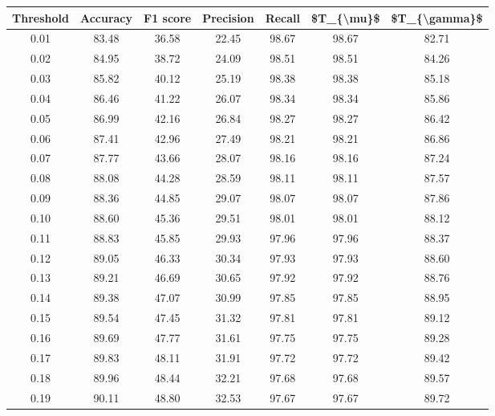 \begin{tabular}{|c|c|c|c|c|c|c|}
\hline
 Threshold &  Accuracy &  F1 score &  Precision &  Recall &  \$T\_\{\textbackslash mu\}\$ &  \$T\_\{\textbackslash gamma\}\$ \\
\hline
      0.01 &     83.48 &     36.58 &      22.45 &   98.67 &      98.67 &         82.71 \\
      0.02 &     84.95 &     38.72 &      24.09 &   98.51 &      98.51 &         84.26 \\
      0.03 &     85.82 &     40.12 &      25.19 &   98.38 &      98.38 &         85.18 \\
      0.04 &     86.46 &     41.22 &      26.07 &   98.34 &      98.34 &         85.86 \\
      0.05 &     86.99 &     42.16 &      26.84 &   98.27 &      98.27 &         86.42 \\
      0.06 &     87.41 &     42.96 &      27.49 &   98.21 &      98.21 &         86.86 \\
      0.07 &     87.77 &     43.66 &      28.07 &   98.16 &      98.16 &         87.24 \\
      0.08 &     88.08 &     44.28 &      28.59 &   98.11 &      98.11 &         87.57 \\
      0.09 &     88.36 &     44.85 &      29.07 &   98.07 &      98.07 &         87.86 \\
      0.10 &     88.60 &     45.36 &      29.51 &   98.01 &      98.01 &         88.12 \\
      0.11 &     88.83 &     45.85 &      29.93 &   97.96 &      97.96 &         88.37 \\
      0.12 &     89.05 &     46.33 &      30.34 &   97.93 &      97.93 &         88.60 \\
      0.13 &     89.21 &     46.69 &      30.65 &   97.92 &      97.92 &         88.76 \\
      0.14 &     89.38 &     47.07 &      30.99 &   97.85 &      97.85 &         88.95 \\
      0.15 &     89.54 &     47.45 &      31.32 &   97.81 &      97.81 &         89.12 \\
      0.16 &     89.69 &     47.77 &      31.61 &   97.75 &      97.75 &         89.28 \\
      0.17 &     89.83 &     48.11 &      31.91 &   97.72 &      97.72 &         89.42 \\
      0.18 &     89.96 &     48.44 &      32.21 &   97.68 &      97.68 &         89.57 \\
      0.19 &     90.11 &     48.80 &      32.53 &   97.67 &      97.67 &         89.72 \\

\end{tabular}
